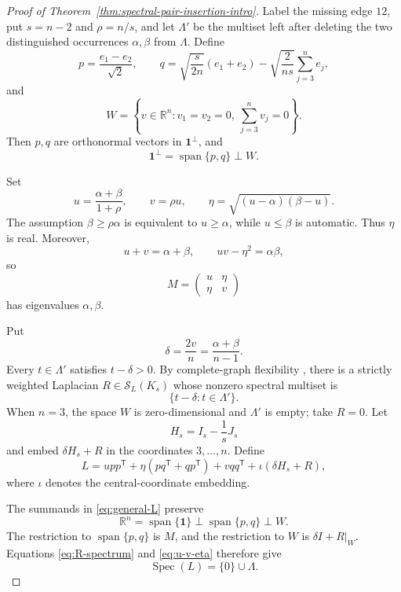 \documentclass[11pt,reqno]{amsart}
\theoremstyle{definition}
\theoremstyle{remark}
\newcommand{\one}{\mathbf 1}
\newcommand{\R}{\mathbb R}
\newcommand{\SL}{\mathcal S_L}
\newcommand{\Spec}{\operatorname{Spec}}
\begin{document}
\begin{proof}[Proof of Theorem~\ref{thm:spectral-pair-insertion-intro}]
Label the missing edge $12$, put $s=n-2$ and $\rho=n/s$, and let
$\Lambda'$ be the multiset left after deleting the two distinguished
occurrences $\alpha,\beta$ from $\Lambda$.
Define
\begin{equation}\label{eq:a-b-def}
  p=\frac{e_1-e_2}{\sqrt2},
  \qquad
  q=\sqrt{\frac{s}{2n}}(e_1+e_2)
  -\sqrt{\frac{2}{ns}}\sum_{j=3}^ne_j,
\end{equation}
and
\[
  W=\left\{v\in\R^n:v_1=v_2=0,\ \sum_{j=3}^nv_j=0\right\}.
\]
Then $p,q$ are orthonormal vectors in $\one^\perp$, and
\[
  \one^\perp=\operatorname{span}\{p,q\}\mathbin\perp W.
\]

Set
\begin{equation}\label{eq:u-v-eta}
  u=\frac{\alpha+\beta}{1+\rho},\qquad
  v=\rho u,\qquad
  \eta=\sqrt{(u-\alpha)(\beta-u)}.
\end{equation}
The assumption $\beta\ge\rho\alpha$ is equivalent to $u\ge\alpha$, while
$u\le\beta$ is automatic.  Thus $\eta$ is real.  Moreover,
\[
  u+v=\alpha+\beta,
  \qquad uv-\eta^2=\alpha\beta,
\]
so
\[
  M=\begin{pmatrix}u&\eta\\\eta&v\end{pmatrix}
\]
has eigenvalues $\alpha,\beta$.

Put
\begin{equation}\label{eq:delta}
  \delta=\frac{2v}{n}=\frac{\alpha+\beta}{n-1}.
\end{equation}
Every $t\in\Lambda'$ satisfies $t-\delta>0$.  By complete-graph flexibility
\cite[Theorem~2.5]{FGL2025}, there is a strictly weighted Laplacian
$R\in\SL(K_s)$ whose nonzero spectral multiset is
\begin{equation}\label{eq:R-spectrum}
  \{t-\delta:t\in\Lambda'\}.
\end{equation}
When $n=3$, the space $W$ is zero-dimensional and $\Lambda'$ is empty; take
$R=0$.  Let
\[
  H_s=I_s-\frac1sJ_s
\]
and embed $\delta H_s+R$ in the coordinates $3,\ldots,n$.  Define
\begin{equation}\label{eq:general-L}
  L=u pp^{\mathsf T}+\eta(pq^{\mathsf T}+qp^{\mathsf T})
    +vqq^{\mathsf T}+\iota(\delta H_s+R),
\end{equation}
where $\iota$ denotes the central-coordinate embedding.

The summands in \eqref{eq:general-L} preserve
\[
  \R^n=\operatorname{span}\{\one\}\mathbin\perp
  \operatorname{span}\{p,q\}\mathbin\perp W.
\]
The restriction to $\operatorname{span}\{p,q\}$ is $M$, and the restriction
to $W$ is $\delta I+R|_W$.  Equations \eqref{eq:R-spectrum} and
\eqref{eq:u-v-eta} therefore give
\[
  \Spec(L)=\{0\}\cup\Lambda.
\]


\end{proof}
\end{document}

